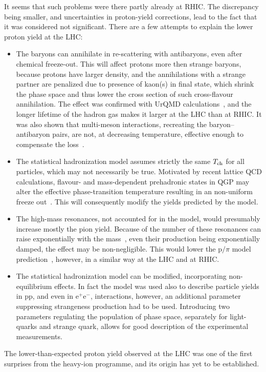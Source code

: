 It seems that such problems were there partly already at RHIC. The discrepancy being smaller, and uncertainties in proton-yield corrections, lead to the fact that it was considered not significant. There are a few attempts to explain the lower proton yield at the LHC:
\begin{itemize}
\item{The baryons can annihilate in re-scattering with antibaryons, even after chemical freeze-out. This will affect protons more then strange baryons, because protons have larger density, and the annihilations with a strange partner are penalized due to presence of kaon(s) in final state, which shrink the phase space and thus lower the cross section of such cross-flavour annihilation. The effect was confirmed with UrQMD calculations~\cite{Karpenko:2012yf,Steinheimer:2012rd,Becattini:2012xb}, and the longer lifetime of the hadron gas makes it larger at the LHC than at RHIC. It was also shown that multi-meson interactions, recreating the baryon--antibaryon pairs, are not, at decreasing temperature, effective enough to compensate the loss~\cite{Pan:2012ne}.}
\item{The statistical hadronization model assumes strictly the same $T_{\rm ch}$ for all particles, which may not necessarily be true. Motivated by recent lattice QCD calculations, flavour- and mass-dependent prehadronic states in QGP may alter the effective phase-transition temperature resulting in an non-uniform freeze out~\cite{Ratti:2011au}. This will consequently modify the yields predicted by the model.}
\item{The high-mass resonances, not accounted for in the model, would presumably increase mostly the pion yield. Because of the number of these resonances can raise exponentially with the mass~\cite{Hagedorn:1965st,RHagedorn:1968}, even their production being exponentially damped, the effect may be non-negligible. This would lower the p$/\pi$ model prediction~\cite{Andronic:2008gu}, however, in a similar way at the LHC and at RHIC.}
\item{The statistical hadronization model can be modified, incorporating non-equilibrium effects. In fact the model was used also to describe particle yields in pp, and even in e$^+$e$^-$, interactions, however, an additional parameter suppressing strangeness production had to be used. Introducing two parameters regulating the population of phase space, separately for light-quarks and strange quark, allows for good description of the experimental measurements.~\cite{Rafelski:2010cw,Petran:2013lja}}
\end{itemize}
The lower-than-expected proton yield observed at the LHC was one of the first surprises from the heavy-ion programme, and its origin has yet to be established.

